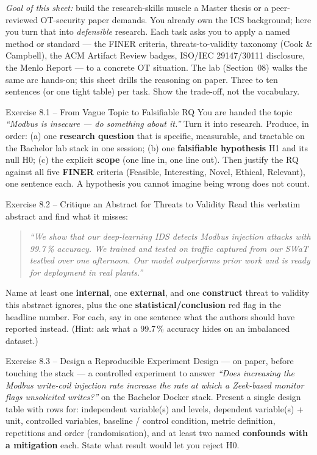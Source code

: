 \documentclass[11pt,a4paper]{article}
\begin{document}
\sheetheader

\noindent
\textit{Goal of this sheet:} build the research-skills muscle a Master thesis or a
peer-reviewed OT-security paper demands. You already own the ICS background; here
you turn that into \emph{defensible} research. Each task asks you to apply a named
method or standard --- the FINER criteria, threats-to-validity taxonomy (Cook \&
Campbell), the ACM Artifact Review badges, ISO/IEC 29147/30111 disclosure, the
Menlo Report --- to a concrete OT situation. The lab (Section~08) walks the same
arc hands-on; this sheet drills the reasoning on paper. Three to ten sentences (or
one tight table) per task. Show the trade-off, not the vocabulary.

\begin{taskbox}{Exercise 8.1 -- From Vague Topic to Falsifiable RQ}
You are handed the topic \emph{``Modbus is insecure --- do something about it.''}
Turn it into research. Produce, in order: (a) one \textbf{research question} that
is specific, measurable, and tractable on the Bachelor lab stack in one session;
(b) one \textbf{falsifiable hypothesis} H1 and its null H0; (c) the explicit
\textbf{scope} (one line in, one line out). Then justify the RQ against all five
\textbf{FINER} criteria (Feasible, Interesting, Novel, Ethical, Relevant), one
sentence each. A hypothesis you cannot imagine being wrong does not count.
\end{taskbox}

\begin{taskbox}{Exercise 8.2 -- Critique an Abstract for Threats to Validity}
Read this verbatim abstract and find what it misses:

\begin{quote}\small\itshape
``We show that our deep-learning IDS detects Modbus injection attacks with
99.7\,\% accuracy. We trained and tested on traffic captured from our SWaT
testbed over one afternoon. Our model outperforms prior work and is ready for
deployment in real plants.''
\end{quote}

Name at least one \textbf{internal}, one \textbf{external}, and one
\textbf{construct} threat to validity this abstract ignores, plus the one
\textbf{statistical/conclusion} red flag in the headline number. For each, say in
one sentence what the authors should have reported instead. (Hint: ask what a
99.7\,\% accuracy hides on an imbalanced dataset.)
\end{taskbox}

\begin{taskbox}{Exercise 8.3 -- Design a Reproducible Experiment}
Design --- on paper, before touching the stack --- a controlled experiment to
answer \emph{``Does increasing the Modbus write-coil injection rate increase the
rate at which a Zeek-based monitor flags unsolicited writes?''} on the Bachelor
Docker stack. Present a single design table with rows for: independent
variable(s) and levels, dependent variable(s) + unit, controlled variables,
baseline / control condition, metric definition, repetitions and order
(randomisation), and at least two named \textbf{confounds with a mitigation}
each. State what result would let you reject H0.
\end{taskbox}
\end{document}
